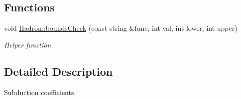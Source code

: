 \subsection*{Functions}
\begin{DoxyCompactItemize}
\item 
void \mbox{\hyperlink{namespaceHadron_a73536a97ce9c6804192b72aceb86eb34}{Hadron\+::bounds\+Check}} (const string \&func, int val, int lower, int upper)
\begin{DoxyCompactList}\small\item\em Helper function. \end{DoxyCompactList}\end{DoxyCompactItemize}


\subsection{Detailed Description}
Subduction coefficients. 

